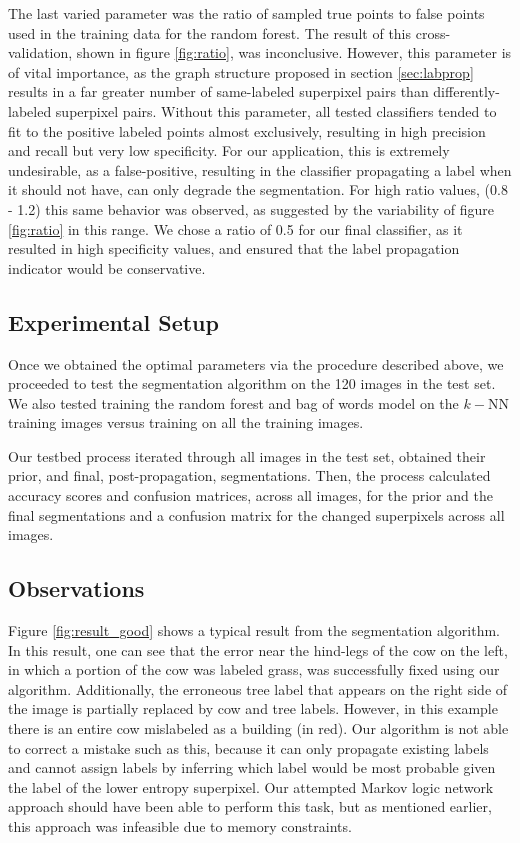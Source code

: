 \documentclass{article} %
\begin{document}
The last varied parameter was the ratio of sampled true points to false points used in the training data for the random forest.
The result of this cross-validation, shown in figure \ref{fig:ratio}, was inconclusive.
However, this parameter is of vital importance, as the graph structure proposed in section \ref{sec:labprop} results in a far greater number of same-labeled superpixel pairs than differently-labeled superpixel pairs.
Without this parameter, all tested classifiers tended to fit to the positive labeled points almost exclusively, resulting in high precision and recall but very low specificity. 
For our application, this is extremely undesirable, as a false-positive, resulting in the classifier propagating a label when it should not have, can only degrade the segmentation. 
For high ratio values, (0.8 - 1.2) this same behavior was observed, as suggested by the variability of figure \ref{fig:ratio} in this range. We chose a ratio of 0.5 for our final classifier, as it resulted in high specificity values, and ensured that the label propagation indicator would be conservative. 

\subsection{Experimental Setup}

Once we obtained the optimal parameters via the procedure described above, we proceeded to test the segmentation algorithm on the 120 images in the test set. We also tested training the random forest and bag of words model on the $k-$NN training images versus training on all the training images.

Our testbed process iterated through all images in the test set, obtained their prior, and final, post-propagation, segmentations. Then, the process calculated accuracy scores and confusion matrices, across all images, for the prior and the final segmentations and a confusion matrix for the changed superpixels across all images. 

\subsection{Observations}
\label{sec:Observations}

Figure \ref{fig:result_good} shows a typical result from the segmentation algorithm. In this result, one can see that the error near the hind-legs of the cow on the left, in which a portion of the cow was labeled grass, was successfully fixed using our algorithm. Additionally, the erroneous tree label that appears on the right side of the image is partially replaced by cow and tree labels. However, in this example there is an entire cow mislabeled as a building (in red). Our algorithm is not able to correct a mistake such as this, because it can only propagate existing labels and cannot assign labels by inferring which label would be most probable given the label of the lower entropy superpixel. Our attempted Markov logic network approach should have been able to perform this task, but as mentioned earlier, this approach was infeasible due to memory constraints.
\end{document}
